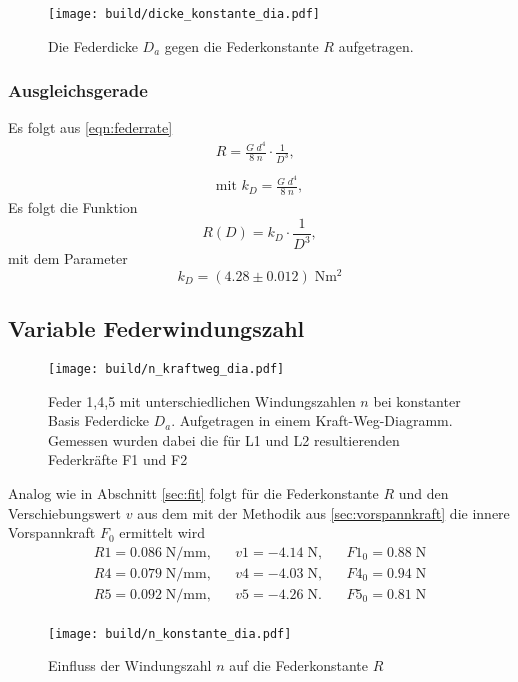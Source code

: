 \begin{figure}[H]
  \center
  \texttt{[image: build/dicke\_konstante\_dia.pdf]}
  \caption{Die Federdicke $D_a$ gegen die Federkonstante $R$ aufgetragen.}
\end{figure}

\subsubsection{Ausgleichsgerade}

Es folgt aus \ref{eqn:federrate}
\begin{align*}
  R=\frac{G\;d^4}{8\;n}\cdot \frac{1}{D^3}, \\\\  
  \text{mit }k_D =\frac{G\;d^4}{8\;n},
\end{align*}
Es folgt die Funktion
\begin{equation*}
  R(D)=k_D \cdot \frac{1}{D^3},
\end{equation*}
mit dem Parameter
\begin{equation*}
  k_D=(4.28 \pm 0.012) \;\si{\N\meter\squared}
\end{equation*}


\subsection{Variable Federwindungszahl}
\begin{figure}[H]
    \center
    \texttt{[image: build/n\_kraftweg\_dia.pdf]}
    \caption{Feder 1,4,5 mit unterschiedlichen Windungszahlen $n$ bei konstanter Basis Federdicke $D_a$.
    Aufgetragen in einem Kraft-Weg-Diagramm. Gemessen wurden dabei die für L1
    und L2 resultierenden Federkräfte F1 und F2}
\end{figure}
Analog wie in Abschnitt \ref{sec:fit} folgt für die Federkonstante $R$
und den Verschiebungswert $v$ aus dem mit der Methodik aus \ref{sec:vorspannkraft}
die innere Vorspannkraft $F_0$ ermittelt wird
\begin{align*}
  R1= 0.086\;\si{\N\per\mm}, &&  v1= -4.14\;\si{\N}, && F1_0=0.88\;\si{\N}\\
  R4= 0.079\;\si{\N\per\mm}, &&  v4= -4.03\;\si{\N}, && F4_0=0.94\;\si{\N}\\
  R5= 0.092\;\si{\N\per\mm}, &&  v5= -4.26\;\si{\N}. && F5_0=0.81\;\si{\N}\\
\end{align*}

\begin{figure}[H]
  \center
  \texttt{[image: build/n\_konstante\_dia.pdf]}
  \caption{Einfluss der Windungszahl $n$ auf die Federkonstante $R$}
\end{figure}

